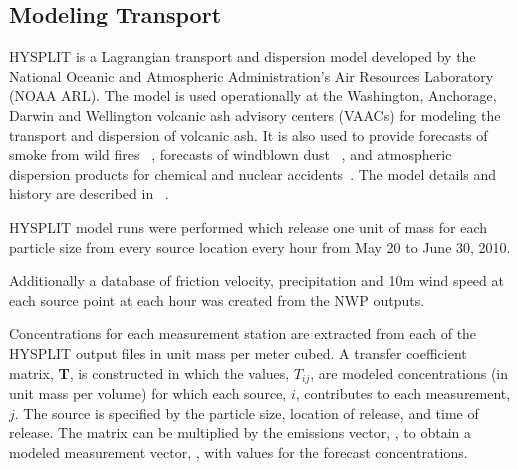 


\subsection{Modeling Transport}
HYSPLIT is a Lagrangian transport and dispersion model developed by the National Oceanic and Atmospheric Administration's Air Resources Laboratory (NOAA ARL).  
The model is used operationally at the  Washington, Anchorage, Darwin and Wellington volcanic ash advisory centers (VAACs) for modeling the transport and dispersion of volcanic ash{\color{blue}.} 
It is also used to provide 
forecasts of smoke from wild fires ~\citep{Rolph09, Stein09}, forecasts of windblown dust ~\citep{Draxler10}, and atmospheric dispersion products for chemical and nuclear accidents~\citep{Draxler12}. The model details and history are described in 
~\cite{Draxler97, Draxler98, bams}. 

HYSPLIT model runs were performed which release one unit of mass for each particle size from every source location every hour from May 20 to June 30, 2010.

Additionally a database of friction velocity, precipitation  and 10m wind speed at each source point at each hour was created from the NWP outputs.

Concentrations for each measurement station are extracted from each of the HYSPLIT  output files in unit mass per meter cubed. 
A transfer coefficient matrix, {\bf T}, is constructed in  
which the  values, $T_{ij}$,  are modeled concentrations (in unit mass per volume) for which each source, $i$,  contributes to each measurement, $j$.
The source is specified by the particle size, location of release, and time of release. 
The matrix can be multiplied by the emissions vector, , to obtain a modeled measurement vector, ,  with values for the forecast concentrations.

